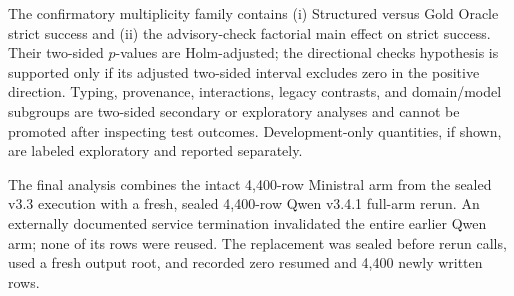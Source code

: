 The confirmatory multiplicity family contains (i) Structured versus Gold Oracle strict success and (ii) the advisory-check factorial main effect on strict success. Their two-sided $p$-values are Holm-adjusted; the directional checks hypothesis is supported only if its adjusted two-sided interval excludes zero in the positive direction. Typing, provenance, interactions, legacy contrasts, and domain/model subgroups are two-sided secondary or exploratory analyses and cannot be promoted after inspecting test outcomes. Development-only quantities, if shown, are labeled exploratory and reported separately.

The final analysis combines the intact 4,400-row Ministral arm from the sealed v3.3 execution with a fresh, sealed 4,400-row Qwen v3.4.1 full-arm rerun. An externally documented service termination invalidated the entire earlier Qwen arm; none of its rows were reused. The replacement was sealed before rerun calls, used a fresh output root, and recorded zero resumed and 4,400 newly written rows.
